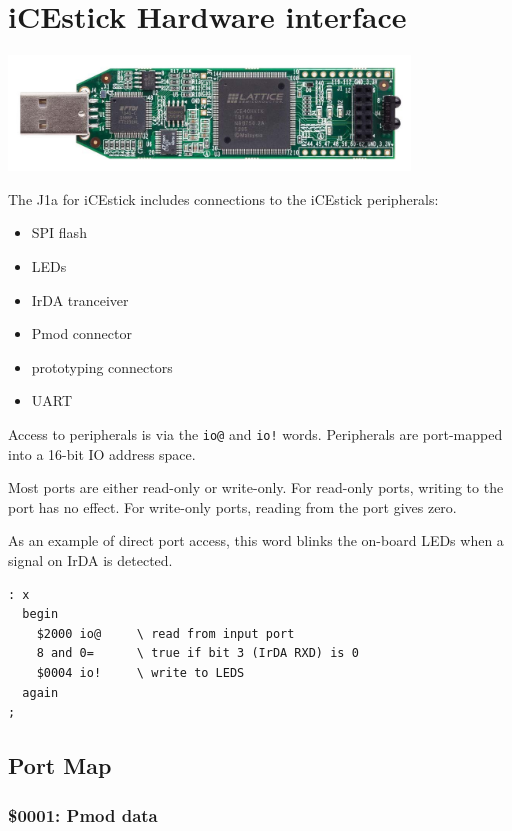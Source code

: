 \documentclass[10pt]{book}
\newcommand{\mach}[1]{\texttt{#1}}
\begin{document}
\chapter{iCEstick Hardware interface}

\begin{center}
\includegraphics[width=0.8\textwidth]{iCEstick.jpg}
\end{center}

The J1a for iCEstick includes connections to the iCEstick peripherals:
\begin{itemize}
\item SPI flash 
\item LEDs 
\item IrDA tranceiver 
\item Pmod connector 
\item prototyping connectors
\item UART 
\end{itemize}

Access to peripherals is via the
\mach{io@} and \mach{io!} words.
Peripherals are port-mapped into a 16-bit IO address space.

Most ports are either read-only or write-only.
For read-only ports, writing to the port has no effect.
For write-only ports, reading from the port gives zero.

As an example of direct port access, this word
blinks the on-board LEDs when a signal on IrDA is detected. 

\begin{framed}
\begin{Verbatim}
: x
  begin
    $2000 io@     \ read from input port
    8 and 0=      \ true if bit 3 (IrDA RXD) is 0
    $0004 io!     \ write to LEDS
  again
;
\end{Verbatim}
\end{framed}

\section{Port Map}
\subsection{\$0001: Pmod data}
\end{document}
